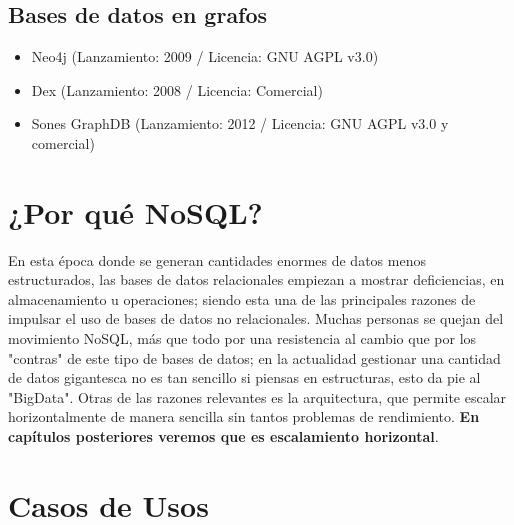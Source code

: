 \subsection*{Bases de datos en grafos}

\begin{itemize}
\item Neo4j (Lanzamiento: 2009 / Licencia: GNU AGPL v3.0)
\item Dex (Lanzamiento: 2008 / Licencia: Comercial)
\item Sones GraphDB (Lanzamiento: 2012 / Licencia: GNU AGPL v3.0 y comercial)
\end{itemize}

\section{¿Por qu\'e NoSQL?}

En esta \'epoca donde se generan cantidades enormes de datos menos estructurados, las bases de datos relacionales empiezan a mostrar deficiencias, en almacenamiento u operaciones; siendo esta una de las principales razones de impulsar el uso de bases de datos no relacionales. Muchas personas se quejan del movimiento NoSQL, m\'as que todo por una resistencia al cambio que por los "contras" de este tipo de bases de datos; en la actualidad gestionar una cantidad de datos gigantesca no es tan sencillo si piensas en estructuras, esto da pie al "BigData". Otras de las razones relevantes es la arquitectura, que permite escalar horizontalmente de manera sencilla sin tantos problemas de rendimiento. \textbf{En cap\'itulos posteriores veremos que es escalamiento horizontal}.

\section{Casos de Usos}

